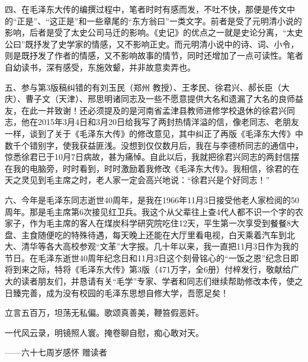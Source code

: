 \documentclass[../../dazhuan.tex]{subfiles}
\begin{document}
四、在毛泽东大传的编撰过程中，笔者时时有感而发，不吐不快，那便是传文中的“正是”、“这正是”和一些章尾的“东方翁曰”一类文字。前者是受了元明清小说的影响，后者是受了太史公司马迁的影响。《史记》的优点之一就是史论分离，“太史公曰”既抒发了史学家的情感，又不影响正史。而元明清小说中的诗、词、小令，则是既抒发了作者的情感，又不影响故事的情节，同时还增加了一点可读性。笔者自幼读书，深有感受，东施效颦，并非故意卖弄也。

五、参与第3版稿纠错的有刘玉民（郑州 教授）、王孝民、徐君兴、郝长臣（大庆）、曹子文（天津）、邢思明诸同志及一些不愿意提供大名和遗漏了大名的良师益友，在此一并致谢！还必须提及的是河南省孟津县教师进修学校退休的徐君兴同志，他在2015年3月4日和3月20日给我写了两封热情洋溢的信，像老同志、老朋友一样，谈到了关于《毛泽东大传》的修改意见，其中纠正了再版《毛泽东大传》中数千个错别字，使我获益匪浅。没想到仅仅数月后，我在与李德桥同志的通信中，惊悉徐君已于10月7日病故，甚为痛悼。自此以后，我就把徐君兴同志的两封信摆在我的电脑旁，时时看到，时时激励着我修改《毛泽东大传》。我相信，徐君的在天之灵见到毛主席之时，老人家一定会高兴地说：“徐君兴是个好同志！”

六、今年是毛泽东同志逝世40周年，是我在1966年11月3日接受他老人家检阅的50周年。那是毛主席第6次接见红卫兵。我这个从父辈往上查4代人都不识一个字的农家子，作为毛主席的客人在煤炭科学研究院吃住12天，平生第一次享受到餐餐8大盘、主食随便吃的特殊待遇，每天晚上还能在大厅里看电视，白天乘着汽车到北大、清华等各大高校参观“文革”大字报。几十年以来，我一直把11月3日作为我的节日。在毛泽东逝世40周年纪念日和11月3日这个刻骨铭心的“一饭之恩”纪念日即将到来之际，特将《毛泽东大传》第3版（471万字，全6册）付梓发行，敬献给广大的读者朋友们，并恳请有关“毛学”专家、学者和同志们继续帮助修改本传，使之日臻完善，成为没有校园的毛泽东思想自修大学，吾愿足矣！

\kaishu
立言五百万，坦荡无私偏。歌颂真善美，鞭笞假恶奸。

一代风云录，明镜照人寰。掩卷聊自慰，痴心敢对天。

\hfil ——六十七周岁感怀 赠读者
\normalfont

\mbox{}\par
{}
\end{document}
